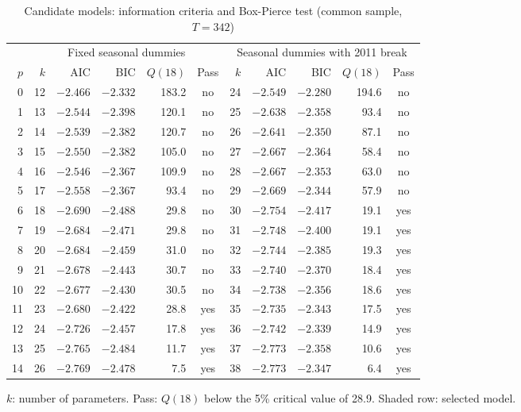 \documentclass[11pt]{article}
\begin{document}
\begin{table}[htbp]
\centering
\small
\caption{Candidate models: information criteria and Box-Pierce test (common sample, $T=342$)}
\label{tab:select}
\setlength{\tabcolsep}{5pt}
\begin{tabular}{@{}r|rrrrc|rrrrc@{}}
\toprule
 & \multicolumn{5}{c|}{Fixed seasonal dummies} & \multicolumn{5}{c}{Seasonal dummies with 2011 break}\\
$p$ & $k$ & AIC & BIC & $Q(18)$ & Pass & $k$ & AIC & BIC & $Q(18)$ & Pass\\
\midrule
0 & 12 & $-2.466$ & $-2.332$ & 183.2 & no & 24 & $-2.549$ & $-2.280$ & 194.6 & no\\
1 & 13 & $-2.544$ & $-2.398$ & 120.1 & no & 25 & $-2.638$ & $-2.358$ & 93.4 & no\\
2 & 14 & $-2.539$ & $-2.382$ & 120.7 & no & 26 & $-2.641$ & $-2.350$ & 87.1 & no\\
3 & 15 & $-2.550$ & $-2.382$ & 105.0 & no & 27 & $-2.667$ & $-2.364$ & 58.4 & no\\
4 & 16 & $-2.546$ & $-2.367$ & 109.9 & no & 28 & $-2.667$ & $-2.353$ & 63.0 & no\\
5 & 17 & $-2.558$ & $-2.367$ & 93.4 & no & 29 & $-2.669$ & $-2.344$ & 57.9 & no\\
6 & 18 & $-2.690$ & $-2.488$ & 29.8 & no & 30 & $-2.754$ & $-2.417$ & 19.1 & yes\\
7 & 19 & $-2.684$ & $-2.471$ & 29.8 & no & 31 & $-2.748$ & $-2.400$ & 19.1 & yes\\
8 & 20 & $-2.684$ & $-2.459$ & 31.0 & no & 32 & $-2.744$ & $-2.385$ & 19.3 & yes\\
9 & 21 & $-2.678$ & $-2.443$ & 30.7 & no & 33 & $-2.740$ & $-2.370$ & 18.4 & yes\\
10 & 22 & $-2.677$ & $-2.430$ & 30.5 & no & 34 & $-2.738$ & $-2.356$ & 18.6 & yes\\
11 & 23 & $-2.680$ & $-2.422$ & 28.8 & yes & 35 & $-2.735$ & $-2.343$ & 17.5 & yes\\
12 & 24 & $-2.726$ & $-2.457$ & 17.8 & yes & 36 & $-2.742$ & $-2.339$ & 14.9 & yes\\
\rowcolor{gray!30} 13 & 25 & $-2.765$ & $\mathbf{-2.484}$ & 11.7 & yes & 37 & $-2.773$ & $-2.358$ & 10.6 & yes\\
14 & 26 & $-2.769$ & $-2.478$ & 7.5 & yes & 38 & $-2.773$ & $-2.347$ & 6.4 & yes\\
\bottomrule
\end{tabular}

\vspace{3pt}
{\footnotesize $k$: number of parameters. Pass: $Q(18)$ below the 5\% critical value of 28.9. Shaded row: selected model.}
\end{table}
\end{document}
